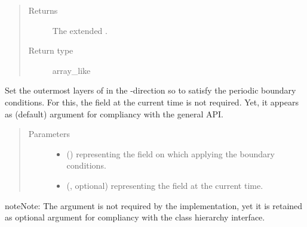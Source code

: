 \documentclass[letterpaper,10pt,english]{sphinxmanual}
\begin{document}
\begin{fulllineitems}
\begin{fulllineitems}
\begin{quote}
\begin{description}
\item[{Returns}] \leavevmode
The extended .

\item[{Return type}] \leavevmode
array\_like

\end{description}\end{quote}

\end{fulllineitems}


\begin{fulllineitems}
\label{\detokenize{api:dycore.horizontal_boundary.PeriodicYZ.set_outermost_layers_y}}
Set the outermost layers of  in the -direction so to satisfy the periodic
boundary conditions. For this, the field  at the current time is not required. Yet,
it appears as (default) argument for compliancy with the general API.
\begin{quote}\begin{description}
\item[{Parameters}] \leavevmode\begin{itemize}
\item {} 
 () \textendash{}  representing the field on which applying the boundary conditions.

\item {} 
 (, optional) \textendash{}  representing the field at the current time.

\end{itemize}

\end{description}\end{quote}

\begin{sphinxadmonition}{note}{Note:}
The argument  is not required by the implementation, yet it is retained as optional
argument for compliancy with the class hierarchy interface.
\end{sphinxadmonition}

\end{fulllineitems}


\end{fulllineitems}
\end{document}
